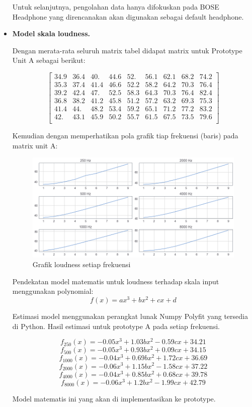 \documentclass[12pt,]{article}
\begin{document}
\begin{itemize}
		Untuk selanjutnya, pengolahan data hanya difokuskan pada BOSE Headphone yang direncanakan akan
		digunakan sebagai default headphone.
		
		\item \textbf{Model skala loudness.}
		
		Dengan merata-rata seluruh matrix tabel didapat matrix untuk Prototype Unit A sebagai berikut:
		
		\[\left[
		\begin{matrix}
			34.9 & 36.4 & 40. &  44.6 & 52. &  56.1 & 62.1 & 68.2 & 74.2\\

			35.3 & 37.4 & 41.4 & 46.6 & 52.2 & 58.2 & 64.2 & 70.3 & 76.4\\

			39.2 & 42.4 & 47. & 52.5 & 58.3 & 64.3 & 70.3 & 76.4 & 82.4\\

			36.8 & 38.2 & 41.2 & 45.8 & 51.2 & 57.2 & 63.2 & 69.3 & 75.3\\

			41.4 & 44. &  48.2 & 53.4 & 59.2 & 65.1 & 71.2 & 77.2 & 83.2\\

			42. &  43.1 & 45.9 & 50.2 & 55.7 & 61.5 & 67.5 & 73.5 & 79.6\\
		\end{matrix}
		\right]\]
	
		Kemudian dengan memperhatikan pola grafik tiap frekuensi (baris) pada matrix unit A:
		\begin{figure}[!ht]
			\centering
			\includegraphics[width=400pt]{images/graph/boseprotoA}
			\caption{Grafik loudness setiap frekuensi}
		\end{figure}
	
		Pendekatan model matematis untuk loudness terhadap skala input menggunakan polynomial:\\
		\[f(x) = ax^3 + bx^2 + cx + d\]
		
		Estimasi model menggunakan perangkat lunak Numpy Polyfit yang tersedia di Python.
		Hasil estimasi untuk prototype A pada setiap frekuensi.
		
		\[f_{250}(x) = -0.05x^3 + 1.03bx^2 - 0.59cx + 34.21\]
		\[f_{500}(x) = -0.05x^3 + 0.93bx^2 + 0.09cx + 34.15\]
		\[f_{1000}(x) = -0.04x^3 + 0.69bx^2 + 1.72cx + 36.69\]
		\[f_{2000}(x) = -0.06x^3 + 1.15bx^2 - 1.58cx + 37.22\]
		\[f_{4000}(x) = -0.04x^3 + 0.85bx^2 + 0.68cx + 39.78\]
		\[f_{8000}(x) = -0.06x^3 + 1.2bx^2 - 1.99cx + 42.79\]
		
		Model matematis ini yang akan di implementasikan ke prototype.
	\end{itemize}
\end{document}
